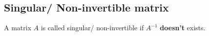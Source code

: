 \subsection{Singular/ Non-invertible matrix}

A matrix $A$ is called singular/ non-invertible if $A^{-1}$ \textbf{doesn't} exists.
\hfill \cite{mfml/book/mml/Deisenroth-Faisal-Ong}




